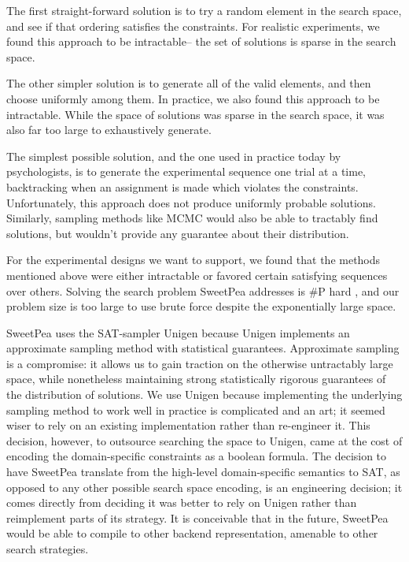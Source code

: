 The first straight-forward solution is to try a random element in the search space, and see if that ordering satisfies the constraints. For realistic experiments, we found this approach to be intractable-- the set of solutions is sparse in the search space.

The other simpler solution is to generate all of the valid elements, and then choose uniformly among them. In practice, we also found this approach to be intractable. While the space of solutions was sparse in the search space, it was also far too large to exhaustively generate.

The simplest possible solution, and the one used in practice today by psychologists, is to generate the experimental sequence one trial at a time, backtracking when an assignment is made which violates the constraints. Unfortunately, this approach does not produce uniformly probable solutions. Similarly, sampling methods like MCMC would also be able to tractably find solutions, but wouldn't provide any guarantee about their distribution.

For the experimental designs we want to support, we found that the methods mentioned above were either intractable or favored certain satisfying sequences over others. Solving the search problem SweetPea addresses is \#P hard \cite{valiant1979complexity}, and our problem size is too large to use brute force despite the exponentially large space.

SweetPea uses the SAT-sampler Unigen because Unigen implements an approximate sampling method with statistical guarantees. Approximate sampling is a compromise: it allows us to gain traction on the otherwise untractably large space, while nonetheless maintaining strong statistically rigorous guarantees of the distribution of solutions. We use Unigen because implementing the underlying sampling method to work well in practice is complicated and an art; it seemed wiser to rely on an existing implementation rather than re-engineer it. This decision, however, to outsource searching the space to Unigen, came at the cost of encoding the domain-specific constraints as a boolean formula. The decision to have SweetPea translate from the high-level domain-specific semantics to SAT, as opposed to any other possible search space encoding, is an engineering decision; it comes directly from deciding it was better to rely on Unigen rather than reimplement parts of its strategy. It is conceivable that in the future, SweetPea would be able to compile to other backend representation, amenable to other search strategies.


